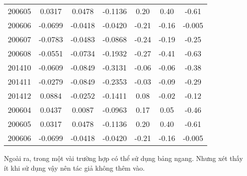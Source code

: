 \begin{longtable}[htbp]{|c|| c|| c|| c|| c|| c|| c|}
  200605 & 0.0317 & 0.0478 & -0.1136 & 0.20 & 0.40 & -0.61 \\
  200606 & -0.0699 & -0.0418 & -0.0420 & -0.21 & -0.16 & -0.005 \\
  200607 & -0.0783 & -0.0483 & -0.0868 & -0.24 & -0.19 & -0.25 \\
  200608 & -0.0551 & -0.0734 & -0.1932 & -0.27 & -0.41 & -0.63 \\
  201410 & -0.0609 & -0.0849 & -0.3131 & -0.06 & -0.06 & -0.38 \\
  201411 & -0.0279 & -0.0849 & -0.2353 & -0.03 & -0.09 & -0.29 \\
  201412 & 0.0884 & -0.0252 & -0.1411 & 0.08 & -0.02 & -0.12 \\ 
  200604 & 0.0437 & 0.0087 & -0.0963 & 0.17 & 0.05 & -0.46 \\
  200605 & 0.0317 & 0.0478 & -0.1136 & 0.20 & 0.40 & -0.61 \\
  200606 & -0.0699 & -0.0418 & -0.0420 & -0.21 & -0.16 & -0.005 \\
\end{longtable}

Ngoài ra, trong một vài trường hợp có thể sử dụng bảng ngang. Nhưng xét thấy ít khi sử dụng vậy nên tác giả không thêm vào.
  
